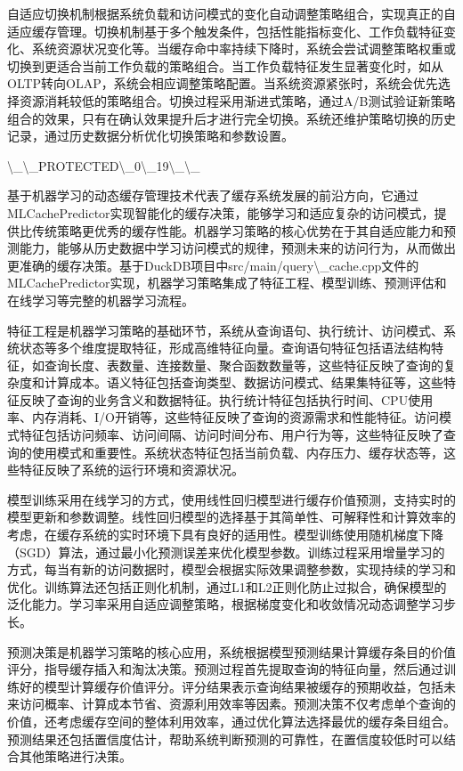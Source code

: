 自适应切换机制根据系统负载和访问模式的变化自动调整策略组合，实现真正的自适应缓存管理。切换机制基于多个触发条件，包括性能指标变化、工作负载特征变化、系统资源状况变化等。当缓存命中率持续下降时，系统会尝试调整策略权重或切换到更适合当前工作负载的策略组合。当工作负载特征发生显著变化时，如从OLTP转向OLAP，系统会相应调整策略配置。当系统资源紧张时，系统会优先选择资源消耗较低的策略组合。切换过程采用渐进式策略，通过A/B测试验证新策略组合的效果，只有在确认效果提升后才进行完全切换。系统还维护策略切换的历史记录，通过历史数据分析优化切换策略和参数设置。

\textbackslash{}_\textbackslash{}_PROTECTED\textbackslash{}_0\textbackslash{}_19\textbackslash{}_\textbackslash{}_

基于机器学习的动态缓存管理技术代表了缓存系统发展的前沿方向，它通过MLCachePredictor实现智能化的缓存决策，能够学习和适应复杂的访问模式，提供比传统策略更优秀的缓存性能。机器学习策略的核心优势在于其自适应能力和预测能力，能够从历史数据中学习访问模式的规律，预测未来的访问行为，从而做出更准确的缓存决策。基于DuckDB项目中src/main/query\textbackslash{}_cache.cpp文件的MLCachePredictor实现，机器学习策略集成了特征工程、模型训练、预测评估和在线学习等完整的机器学习流程。

特征工程是机器学习策略的基础环节，系统从查询语句、执行统计、访问模式、系统状态等多个维度提取特征，形成高维特征向量。查询语句特征包括语法结构特征，如查询长度、表数量、连接数量、聚合函数数量等，这些特征反映了查询的复杂度和计算成本。语义特征包括查询类型、数据访问模式、结果集特征等，这些特征反映了查询的业务含义和数据特征。执行统计特征包括执行时间、CPU使用率、内存消耗、I/O开销等，这些特征反映了查询的资源需求和性能特征。访问模式特征包括访问频率、访问间隔、访问时间分布、用户行为等，这些特征反映了查询的使用模式和重要性。系统状态特征包括当前负载、内存压力、缓存状态等，这些特征反映了系统的运行环境和资源状况。

模型训练采用在线学习的方式，使用线性回归模型进行缓存价值预测，支持实时的模型更新和参数调整。线性回归模型的选择基于其简单性、可解释性和计算效率的考虑，在缓存系统的实时环境下具有良好的适用性。模型训练使用随机梯度下降（SGD）算法，通过最小化预测误差来优化模型参数。训练过程采用增量学习的方式，每当有新的访问数据时，模型会根据实际效果调整参数，实现持续的学习和优化。训练算法还包括正则化机制，通过L1和L2正则化防止过拟合，确保模型的泛化能力。学习率采用自适应调整策略，根据梯度变化和收敛情况动态调整学习步长。

预测决策是机器学习策略的核心应用，系统根据模型预测结果计算缓存条目的价值评分，指导缓存插入和淘汰决策。预测过程首先提取查询的特征向量，然后通过训练好的模型计算缓存价值评分。评分结果表示查询结果被缓存的预期收益，包括未来访问概率、计算成本节省、资源利用效率等因素。预测决策不仅考虑单个查询的价值，还考虑缓存空间的整体利用效率，通过优化算法选择最优的缓存条目组合。预测结果还包括置信度估计，帮助系统判断预测的可靠性，在置信度较低时可以结合其他策略进行决策。

